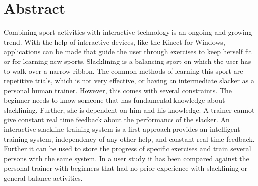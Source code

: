 \section*{Abstract}
\begin{comment}
- Einleitung
- Problem/Ziele
- Vorgesteller lösungsansatz
-- Exergame
-- SLS
-- Real time feedback
- einbau methodischer reihe als lernmethodik
- vergleich zu üblichen personal trainer
- Messung
- Results
- Conclusion


- trend von interaktiven lernmethodiken in allen bereichen des sports
- nichts vergeichbares in slacklinen
- Führen des nutzers mithilfe einer bestimmten lernmethodik und routine
- studie
\end{comment}
Combining sport activities with interactive technology is an ongoing and growing trend.
With the help of interactive devices, like the Kinect for Windows, applications can be made that guide the user through exercises to keep herself fit or for learning new sports.
Slacklining is a balancing sport on which the user has to walk over a narrow ribbon. The common methods of learning this sport are repetitive trials, which is not very effective, or having an intermediate slacker as a personal human trainer.
However, this comes with several constraints. The beginner needs to know someone that has fundamental knowledge about slacklining. Further, she is dependent on him and his knowledge. A trainer cannot give constant real time feedback about the performance of the slacker.
An interactive slackline training system is a first approach provides an intelligent training system, independency of any other help, and constant real time feedback. Further it can be used to store the progress of specific exercises and train several persons with the same system.
In a user study it has been compared against the personal trainer with beginners that had no prior experience with slacklining or general balance activities.




